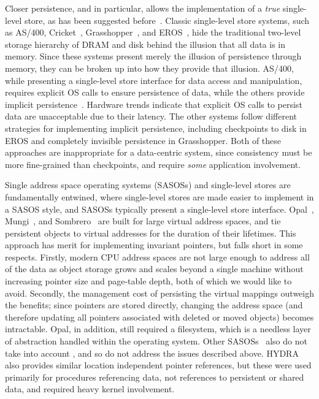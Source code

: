 Closer persistence, and \NVM in particular, allows the implementation of a \textit{true}
single-level store, as has been suggested before~\cite{bailey:hotos11}.
Classic single-level store systems, such as AS/400, Cricket~\cite{shekita:uwtr956},
Grasshopper~\cite{dearli:cs94}, and
EROS~\cite{shapiro:usenix02}, hide the traditional two-level storage hierarchy of DRAM and disk
behind the illusion that all data is in memory. Since these systems present merely the illusion of persistence
through memory, they can be broken up into how they provide that illusion. AS/400, while presenting
a single-level store interface for data access and manipulation, requires explicit OS calls to
ensure persistence of data, while the others provide implicit persistence~\cite{dearli:cs94}.
Hardware trends indicate that explicit OS calls to persist data are unacceptable
due to their latency. The other systems follow different strategies for implementing implicit
persistence, including checkpoints to disk in EROS and completely invisible persistence in
Grasshopper. Both of these approaches are inappropriate for a data-centric system, since consistency must be more
fine-grained than checkpoints, and require \emph{some} application involvement.

Single address space operating systems (SASOSs) and single-level stores are fundamentally entwined,
where single-level stores are made easier to implement in a SASOS style, and SASOSs typically
present a single-level store interface. Opal~\cite{chase:sosp01}, Mungi~\cite{heiser:scse9314}, and
Sombrero~\cite{miller:osr00} are built for large virtual address spaces, and tie persistent objects
to virtual addresses for the duration of their lifetimes. This approach has merit for implementing
invariant pointers, but falls short in some respects. Firstly, modern
CPU address spaces are not large enough to address all of the data as object storage grows and
scales beyond a single machine without increasing pointer size and page-table depth, both of which
we would like to avoid. Secondly, the management cost of persisting the virtual mappings
outweigh the benefits; since pointers are stored directly, changing the address space (and
therefore updating all pointers associated with deleted or moved objects) becomes intractable.
Opal, in addition, still required a filesystem, which is a needless layer of abstraction handled
within the operating system. Other
SASOSs~\cite{roscoe:osr94,heiser:scse9314,miller:osr00} also do not take into account \NVM, and so
do not address the issues described above.
HYDRA~\cite{wulf:cacm74} also provides similar location independent pointer references, but these
were used primarily for procedures referencing data, not references to persistent or shared data, and required
heavy kernel involvement.

